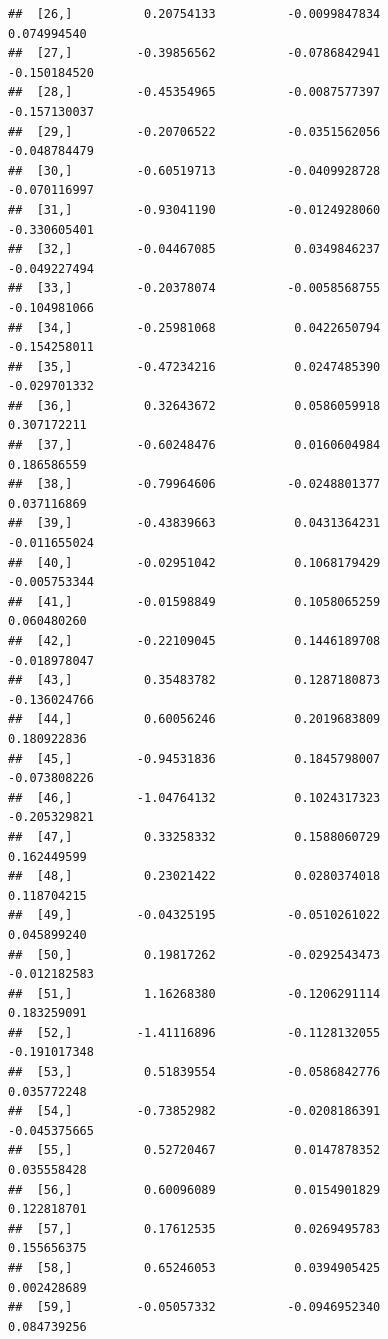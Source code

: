 \documentclass[11pt,preprint, authoryear]{elsarticle}
\numberwithin{equation}{section}
\numberwithin{figure}{section}
\numberwithin{table}{section}
\begin{document}
\begin{verbatim}
##  [26,]          0.20754133          -0.0099847834             0.074994540
##  [27,]         -0.39856562          -0.0786842941            -0.150184520
##  [28,]         -0.45354965          -0.0087577397            -0.157130037
##  [29,]         -0.20706522          -0.0351562056            -0.048784479
##  [30,]         -0.60519713          -0.0409928728            -0.070116997
##  [31,]         -0.93041190          -0.0124928060            -0.330605401
##  [32,]         -0.04467085           0.0349846237            -0.049227494
##  [33,]         -0.20378074          -0.0058568755            -0.104981066
##  [34,]         -0.25981068           0.0422650794            -0.154258011
##  [35,]         -0.47234216           0.0247485390            -0.029701332
##  [36,]          0.32643672           0.0586059918             0.307172211
##  [37,]         -0.60248476           0.0160604984             0.186586559
##  [38,]         -0.79964606          -0.0248801377             0.037116869
##  [39,]         -0.43839663           0.0431364231            -0.011655024
##  [40,]         -0.02951042           0.1068179429            -0.005753344
##  [41,]         -0.01598849           0.1058065259             0.060480260
##  [42,]         -0.22109045           0.1446189708            -0.018978047
##  [43,]          0.35483782           0.1287180873            -0.136024766
##  [44,]          0.60056246           0.2019683809             0.180922836
##  [45,]         -0.94531836           0.1845798007            -0.073808226
##  [46,]         -1.04764132           0.1024317323            -0.205329821
##  [47,]          0.33258332           0.1588060729             0.162449599
##  [48,]          0.23021422           0.0280374018             0.118704215
##  [49,]         -0.04325195          -0.0510261022             0.045899240
##  [50,]          0.19817262          -0.0292543473            -0.012182583
##  [51,]          1.16268380          -0.1206291114             0.183259091
##  [52,]         -1.41116896          -0.1128132055            -0.191017348
##  [53,]          0.51839554          -0.0586842776             0.035772248
##  [54,]         -0.73852982          -0.0208186391            -0.045375665
##  [55,]          0.52720467           0.0147878352             0.035558428
##  [56,]          0.60096089           0.0154901829             0.122818701
##  [57,]          0.17612535           0.0269495783             0.155656375
##  [58,]          0.65246053           0.0394905425             0.002428689
##  [59,]         -0.05057332          -0.0946952340             0.084739256

\end{verbatim}
\end{document}
